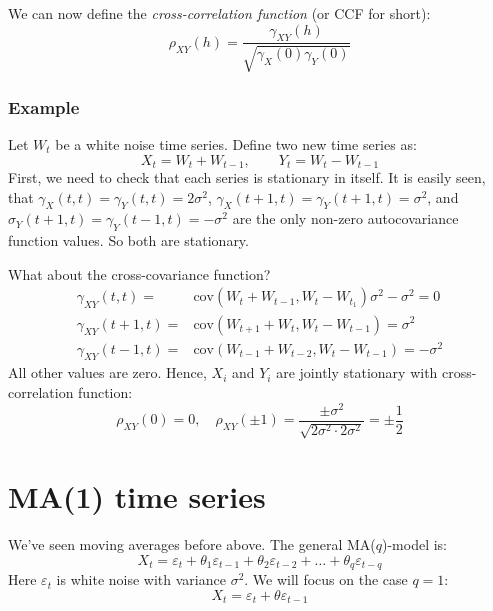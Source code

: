 \documentclass[12pt, a4paper]{article}
\numberwithin{equation}{section}
\begin{document}
We can now define the \textit{cross-correlation function} (or CCF for short):
\begin{equation}
\rho_{XY}(h)=\frac{\gamma_{XY}(h)}{\sqrt{\gamma_X(0)\gamma_Y(0)}}
\end{equation}

\subsubsection{Example}
Let $W_t$ be a white noise time series. Define two new time series as:
\begin{equation}
X_t=W_t+W_{t-1},\qquad Y_t=W_t-W_{t-1}
\end{equation}
First, we need to check that each series is stationary in itself. It is easily seen, that $\gamma_X(t,t)=\gamma_Y(t,t)=2\sigma^2$, $\gamma_X(t+1,t)=\gamma_Y(t+1,t)=\sigma^2$, and $\sigma_Y(t+1,t)=\gamma_Y(t-1,t)=-\sigma^2$ are the only non-zero autocovariance function values. So both are stationary.

What about the cross-covariance function?
\begin{align}
\gamma_{XY}(t,t)=&\textrm{cov}(W_t+W_{t-1},W_t-W_{t_1})\sigma^2-\sigma^2=0\\
\gamma_{XY}(t+1,t)=&\textrm{cov}(W_{t+1}+W_t,W_t-W_{t-1})=\sigma^2\\
\gamma_{XY}(t-1,t)=&\textrm{cov}(W_{t-1}+W_{t-2},W_t-W_{t-1})=-\sigma^2
\end{align}
All other values are zero. Hence, $X_i$ and $Y_i$ are jointly stationary with cross-correlation function:
\begin{equation}
\rho_{XY}(0)=0,\quad\rho_{XY}(\pm 1)=\frac{\pm\sigma^2}{\sqrt{2\sigma^2\cdot 2\sigma^2}}=\pm\frac{1}{2}
\end{equation}


\section{MA(1) time series}
We've seen moving averages before above. The general MA($q$)-model is:
\begin{equation}
X_t=\varepsilon_t+\theta_1\varepsilon_{t-1}+\theta_2\varepsilon_{t-2}+\ldots +\theta_q\varepsilon_{t-q}
\end{equation}
Here $\varepsilon_t$ is white noise with variance $\sigma^2$. We will focus on the case $q=1$:
\begin{equation}
X_t=\varepsilon_t+\theta\varepsilon_{t-1}
\end{equation}
\end{document}
